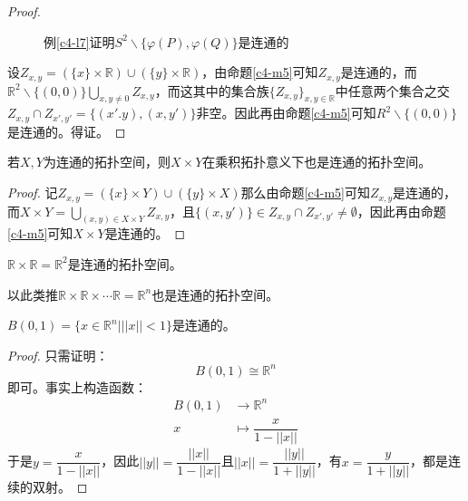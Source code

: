 \documentclass[lang=cn,10pt,device=pad]{elegantbook}
\newcommand{\dabing}{\displaystyle\bigcup}
\newcommand{\dkh}[1]{\{#1\}}
\newcommand{\chadiao}{\backslash}
\newcommand{\R}{\mathbb{R}}
\begin{document}
\begin{proof}
\begin{figure}[h]
\begin{tikzpicture}[x=0.75pt,y=0.75pt,yscale=-1,xscale=1]
\end{tikzpicture}
\caption{例\ref{c4-l7}证明$S^{2}\chadiao\dkh{\varphi(P),\varphi(Q)}$是连通的}
	\end{figure}
	
	
	
	
	设$Z_{x,y} = (\dkh{x}\times \mathbb{R})\cup(\dkh{y}\times \mathbb{R})$，由命题\ref{c4-m5}可知$Z_{x,y}$是连通的，而$\R^{2}\chadiao\dkh{(0,0)}\dabing_{x,y\neq 0}Z_{x,y}$，而这其中的集合族$\dkh{Z_{x,y}}_{x,y\in\R }$中任意两个集合之交$Z_{x,y}\cap Z_{x',y'} = \dkh{(x'.y),(x,y')}$非空。因此再由命题\ref{c4-m5}可知$R^{2}\chadiao\dkh{(0,0)}$是连通的。得证。
\end{proof}


\begin{proposition}[连通拓扑空间的乘积拓扑空间也是连通的]
	若$X,Y$为连通的拓扑空间，则$X\times Y$在乘积拓扑意义下也是连通的拓扑空间。
\end{proposition}
\begin{proof}
	记$Z_{x,y} =(\dkh{x}\times Y)\cup(\dkh{y}\times X)$那么由命题\ref{c4-m5}可知$Z_{x,y}$是连通的，而$X\times Y = \dabing_{(x,y)\in X\times Y}Z_{x,y}$，且$\dkh{(x,y')}\in Z_{x,y}\cap Z_{x',y'}\neq \emptyset$，因此再由命题\ref{c4-m5}可知$X\times Y$是连通的。
\end{proof}
\begin{example}[欧氏空间是连通的]
	$\R \times \R = \R^{2}$是连通的拓扑空间。
	\begin{note}
	以此类推$\R \times \R \times \cdots \R  = \R^{n}$也是连通的拓扑空间。	
	\end{note}
\end{example}
\begin{example}[欧氏空间中的单位球面是连通的]
	$B(0,1) = \dkh{x\in \mathbb{R}^{n}|||x||<1}$是连通的。
\end{example}
\begin{proof}
	只需证明：
	\begin{equation*}
		B(0,1)\cong \mathbb{R}^{n}
	\end{equation*}即可。事实上构造函数：
	\begin{equation*}
		\begin{aligned}
			B(0,1)&\longrightarrow \mathbb{R}^{n}\\
			x&\longmapsto \dfrac{x}{1-||x||}
		\end{aligned}
	\end{equation*}
	于是$y = \dfrac{x}{1-||x||}$，因此$||y|| = \dfrac{||x||}{1-||x||}$且$||x|| = \dfrac{||y||}{1+||y||}$，有$x = \dfrac{y}{1+||y||}$，都是连续的双射。
\end{proof}
\end{document}
